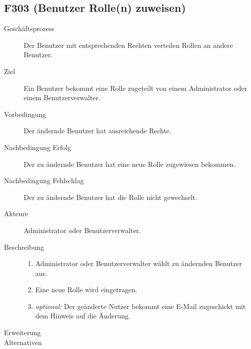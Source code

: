 \subsection{F303 (Benutzer Rolle(n) zuweisen)}
\begin{description}
  \item[Geschäftsprozess]Der Benutzer mit entsprechenden Rechten verteilen Rollen an andere Benutzer.
  \item[Ziel]Ein Benutzer bekommt eine Rolle zugeteilt von einem Administrator oder einem Benutzerverwalter.
  \item[Vorbedingung]Der ändernde Benutzer hat ausreichende Rechte.
  \item[Nachbedingung Erfolg]Der zu ändernde Benutzer hat eine neue Rolle zugewiesen bekommen.
  \item[Nachbedingung Fehlschlag]Der zu ändernde Benutzer hat die Rolle nicht gewechselt.
  \item[Akteure]Administrator oder Benutzerverwalter.
  \item[Beschreibung]\hfill
  \begin{enumerate}
  \item Administrator oder Benutzerverwalter wählt zu ändernden Benutzer aus.
  \item Eine neue Rolle wird eingetragen.
  \item \emph{optional:} Der geänderte Nutzer bekommt eine E-Mail zugeschickt mit dem Hinweis auf die Änderung.
  \end{enumerate}
  \item[Erweiterung]
  \item[Alternativen]
\end{description}
